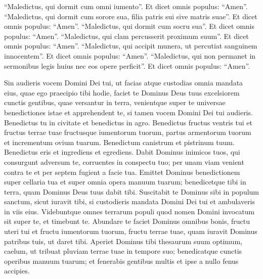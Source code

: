 \begin{biblechapter}
\begin{biblechapter}
\begin{biblechapter}
\begin{biblechapter}
\begin{biblechapter}
\begin{biblechapter}
\begin{biblechapter}
\begin{biblechapter}
\begin{biblechapter}
\begin{biblechapter}
\begin{biblechapter}
\begin{biblechapter}
\begin{biblechapter}
\begin{biblechapter}
\begin{biblechapter}
\begin{biblechapter}
\begin{biblechapter}
\begin{biblechapter}
\begin{biblechapter}
\begin{biblechapter}
\begin{biblechapter}
\begin{biblechapter}
\begin{biblechapter}
\begin{biblechapter}
\begin{biblechapter}
\begin{biblechapter}
\begin{biblechapter}
 \verse “Maledictus, qui dormit cum omni iumento”. Et dicet omnis populus: “Amen”.
 \verse “Maledictus, qui dormit cum sorore sua, filia patris sui sive matris suae”. Et dicet omnis populus: “Amen”.
 \verse “Maledictus, qui dormit cum socru sua”. Et dicet omnis populus: “Amen”.
 \verse “Maledictus, qui clam percusserit proximum suum”. Et dicet omnis populus: “Amen”.
 \verse “Maledictus, qui accipit munera, ut percutiat sanguinem innocentem”. Et dicet omnis populus: “Amen”.
 \verse “Maledictus, qui non permanet in sermonibus legis huius nec eos opere perficit”. Et dicet omnis populus: “Amen”.
 
\begin{biblechapter}
\verse Sin audieris vocem Domini Dei tui, ut facias atque custodias omnia mandata eius, quae ego praecipio tibi hodie, faciet te Dominus Deus tuus excelsiorem cunctis gentibus, quae versantur in terra, 
\verse venientque super te universae benedictiones istae et apprehendent te, si tamen vocem Domini Dei tui audieris.
 \verse Benedictus tu in civitate et benedictus in agro. 
\verse Benedictus fructus ventris tui et fructus terrae tuae fructusque iumentorum tuorum, partus armentorum tuorum et incrementum ovium tuarum. 
\verse Benedictum canistrum et pistrinum tuum. 
\verse Benedictus eris et ingrediens et egrediens. 
\verse Dabit Dominus inimicos tuos, qui consurgunt adversum te, corruentes in conspectu tuo; per unam viam venient contra te et per septem fugient a facie tua. 
\verse Emittet Dominus benedictionem super cellaria tua et super omnia opera manuum tuarum; benedicetque tibi in terra, quam Dominus Deus tuus dabit tibi.
 \verse Suscitabit te Dominus sibi in populum sanctum, sicut iuravit tibi, si custodieris mandata Domini Dei tui et ambulaveris in viis eius. 
\verse Videbuntque omnes terrarum populi quod nomen Domini invocatum sit super te, et timebunt te.
 \verse Abundare te faciet Dominus omnibus bonis, fructu uteri tui et fructu iumentorum tuorum, fructu terrae tuae, quam iuravit Dominus patribus tuis, ut daret tibi. 
\verse Aperiet Dominus tibi thesaurum suum optimum, caelum, ut tribuat pluviam terrae tuae in tempore suo; benedicatque cunctis operibus manuum tuarum; et fenerabis gentibus multis et ipse a nullo fenus accipies. 

\end{biblechapter}
\end{biblechapter}
\end{biblechapter}
\end{biblechapter}
\end{biblechapter}
\end{biblechapter}
\end{biblechapter}
\end{biblechapter}
\end{biblechapter}
\end{biblechapter}
\end{biblechapter}
\end{biblechapter}
\end{biblechapter}
\end{biblechapter}
\end{biblechapter}
\end{biblechapter}
\end{biblechapter}
\end{biblechapter}
\end{biblechapter}
\end{biblechapter}
\end{biblechapter}
\end{biblechapter}
\end{biblechapter}
\end{biblechapter}
\end{biblechapter}
\end{biblechapter}
\end{biblechapter}
\end{biblechapter}
